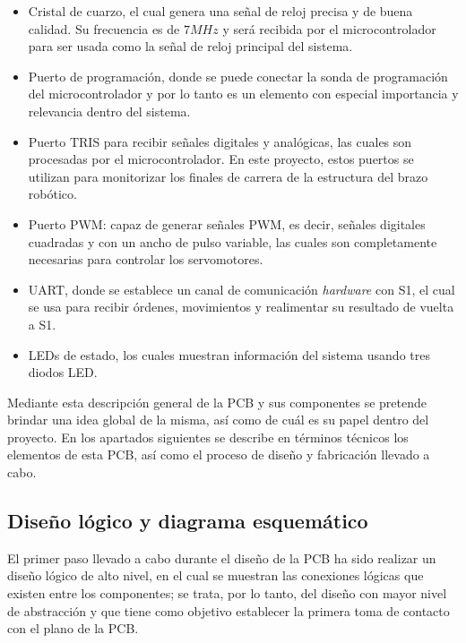 \begin{itemize}
    \item Cristal de cuarzo, el cual genera una señal de reloj precisa y de buena calidad. Su frecuencia es de $7MHz$ y será recibida por el microcontrolador para ser usada como la señal de reloj principal del sistema.
    
    \item Puerto de programación, donde se puede conectar la sonda de programación del microcontrolador y por lo tanto es un elemento con especial importancia y relevancia dentro del sistema.
    
    \item Puerto TRIS para recibir señales digitales y analógicas, las cuales son procesadas por el microcontrolador. En este proyecto, estos puertos se utilizan para monitorizar los finales de carrera de la estructura del brazo robótico.
    \item Puerto PWM: capaz de generar señales PWM, es decir, señales digitales cuadradas y con un ancho de pulso variable, las cuales son completamente necesarias para controlar los servomotores.
    
    \item UART, donde se establece un canal de comunicación \textit{hardware} con S1, el cual se usa para recibir órdenes, movimientos y realimentar su resultado de vuelta a S1.
    
    \item LEDs de estado, los cuales muestran información del sistema usando tres diodos LED.
\end{itemize}

Mediante esta descripción general de la \ac{PCB} y sus componentes se pretende brindar una idea global de la misma, así como de cuál es su papel dentro del proyecto. En los apartados siguientes se describe en términos técnicos los elementos de esta \ac{PCB}, así como el proceso de diseño y fabricación llevado a cabo.

\subsection{Diseño lógico y diagrama esquemático}

El primer paso llevado a cabo durante el diseño de la \ac{PCB} ha sido realizar un diseño lógico de alto nivel, en el cual se muestran las conexiones lógicas que existen entre los componentes; se trata, por lo tanto, del diseño con mayor nivel de abstracción y que tiene como objetivo establecer la primera toma de contacto con el plano de la \ac{PCB}.

